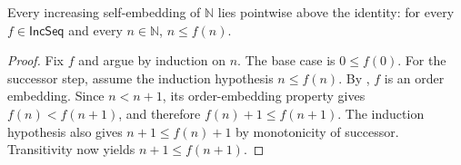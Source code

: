 \begin{lemma}
Every increasing self-embedding of $\mathbb N$ lies pointwise above the
identity: for every $f\in\mathsf{IncSeq}$ and every $n\in\mathbb N$,
$n\leq f(n)$.
\end{lemma}
\begin{proof}
Fix $f$ and argue by induction on $n$.  The base case is $0\leq f(0)$.
For the successor step, assume the induction hypothesis $n\leq f(n)$.
By , $f$ is an order embedding.  Since $n<n+1$, its
order-embedding property gives $f(n)<f(n+1)$, and therefore
$f(n)+1\leq f(n+1)$.  The induction hypothesis also gives
$n+1\leq f(n)+1$ by monotonicity of successor.  Transitivity now yields
$n+1\leq f(n+1)$.
\end{proof}
